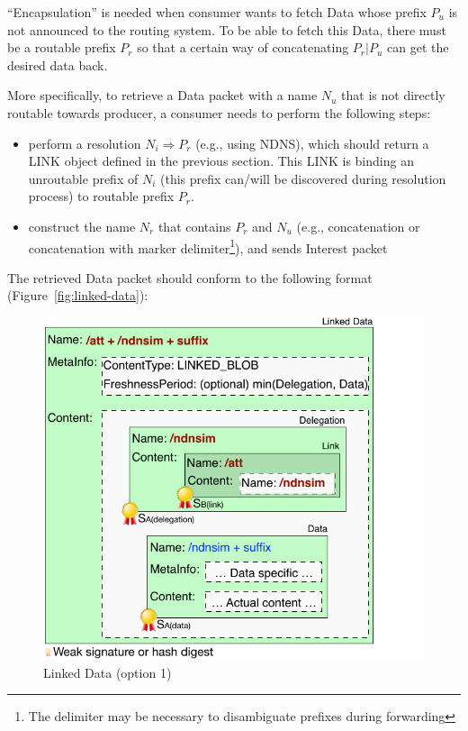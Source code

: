 \documentclass[10pt]{article}
\begin{document}
``Encapsulation'' is needed when consumer wants to fetch Data whose prefix $P_u$ is not announced to the routing system.
To be able to fetch this Data, there must be a routable prefix $P_r$ so that a certain way of concatenating $P_r|P_u$ can get the desired data back.

More specifically, to retrieve a Data packet with a name $N_{u}$ that is not directly routable towards producer, a consumer needs to perform the following steps:

\begin{itemize}
\item perform a resolution $N_i \Rightarrow P_r$ (e.g., using NDNS), which should return a LINK object defined in the previous section.
  This LINK is binding an unroutable prefix of $N_i$ (this prefix can/will be discovered during resolution process) to routable prefix $P_r$.
\item construct the name $N_{r}$ that contains $P_r$ and $N_{u}$ (e.g., concatenation or concatenation with marker delimiter\footnote{The delimiter may be necessary to disambiguate prefixes during forwarding}), and sends Interest packet
\end{itemize}

The retrieved Data packet should conform to the following format (Figure~\ref{fig:linked-data}):

\begin{figure}[h]
  \centering
  \includegraphics[scale=0.8]{linked-data}
  \caption{Linked Data (option 1)}
  \label{fig:linked-dat}
\end{figure}
\end{document}

